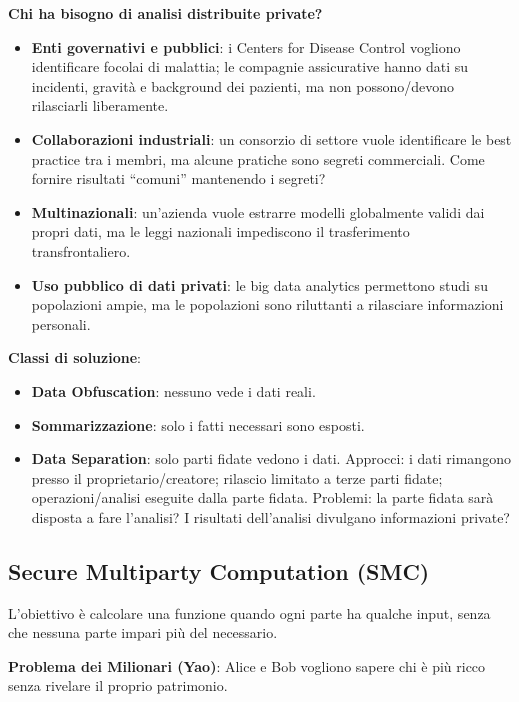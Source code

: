 \documentclass[a4paper,11pt]{article}
\begin{document}
\textbf{Chi ha bisogno di analisi distribuite private?}
\begin{itemize}
  \item \textbf{Enti governativi e pubblici}: i Centers for Disease Control vogliono identificare focolai di malattia; le compagnie assicurative hanno dati su incidenti, gravità e background dei pazienti, ma non possono/devono rilasciarli liberamente.
  \item \textbf{Collaborazioni industriali}: un consorzio di settore vuole identificare le best practice tra i membri, ma alcune pratiche sono segreti commerciali. Come fornire risultati ``comuni'' mantenendo i segreti?
  \item \textbf{Multinazionali}: un'azienda vuole estrarre modelli globalmente validi dai propri dati, ma le leggi nazionali impediscono il trasferimento transfrontaliero.
  \item \textbf{Uso pubblico di dati privati}: le big data analytics permettono studi su popolazioni ampie, ma le popolazioni sono riluttanti a rilasciare informazioni personali.
\end{itemize}

\textbf{Classi di soluzione}:
\begin{itemize}
  \item \textbf{Data Obfuscation}: nessuno vede i dati reali.
  \item \textbf{Sommarizzazione}: solo i fatti necessari sono esposti.
  \item \textbf{Data Separation}: solo parti fidate vedono i dati. Approcci: i dati rimangono presso il proprietario/creatore; rilascio limitato a terze parti fidate; operazioni/analisi eseguite dalla parte fidata. Problemi: la parte fidata sarà disposta a fare l'analisi? I risultati dell'analisi divulgano informazioni private?
\end{itemize}

\subsection{Secure Multiparty Computation (SMC)}

\begin{definizione}[SMC]
L'obiettivo \`{e} calcolare una funzione quando ogni parte ha qualche input, senza che nessuna parte impari pi\`{u} del necessario.

\textbf{Problema dei Milionari (Yao)}: Alice e Bob vogliono sapere chi \`{e} pi\`{u} ricco senza rivelare il proprio patrimonio.
\end{definizione}
\end{document}
